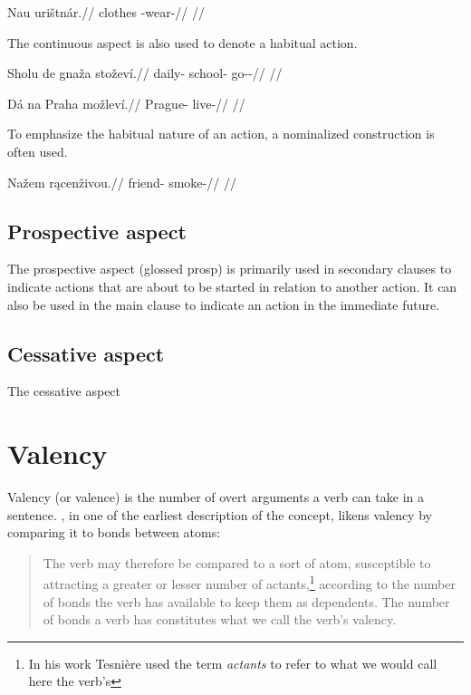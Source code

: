 \pex
\begingl
\gla Nau urištnár.//
\glb clothes \Refl{}-wear-//
\glft {} //
\endgl
\xe

The continuous aspect is also used to denote a habitual action.

\pex
\begingl
\gla Sholu de gnaža stoževí.//
\glb daily-\Ins{}  school-\Pat{} go-\Av{}-\Cont{}//
\glft {} //
\endgl
\xe

\pex
\begingl
\gla Dá na Praha možleví.//
\glb {} \Loc{} Prague-\Pat{} live-//
\glft {} //
\endgl
\xe

To emphasize the habitual nature of an action, a nominalized construction is often used.

\pex
\begingl
\gla Nažem r\k{a}cenživou.//
\glb friend-\First{}\Sg{} smoke-//
\glft {} //
\endgl
\xe

\subsection{Prospective aspect}
\par The prospective aspect (glossed {\sc prosp}) is primarily used in secondary clauses to indicate actions that are about to be started in relation to another action. It can also be used in the main clause to indicate an action in the immediate future.

\subsection{Cessative aspect}
The cessative aspect

\section{Valency}

Valency (or valence) is the number of overt arguments a verb can take in a sentence. \textcite[239]{tesniere1965}, in one of the earliest description of the concept, likens valency by comparing it to bonds between atoms:
\begin{quotation}
	\small
The verb may therefore be compared to a sort of atom, susceptible to attracting a greater or lesser number of actants,\footnote{In his work Tesni\`ere used the term \emph{actants} to refer to what we would call here the verb's } according to the number of bonds the verb has available to keep them as dependents. The number of bonds a verb has constitutes what we call the verb's valency.
\end{quotation}

